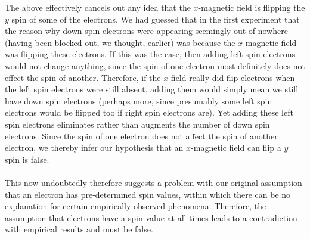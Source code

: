 The above effectively cancels out any idea that the $x$-magnetic field is flipping the $y$ spin of some of the electrons. We had guessed that in the first experiment that the reason why down spin electrons were appearing seemingly out of nowhere (having been blocked out, we thought, earlier) was because the $x$-magnetic field was flipping these electrons. If this was the case, then adding left spin electrons would not change anything, since the spin of one electron most definitely does not effect the spin of another. Therefore, if the $x$ field really did flip electrons when the left spin electrons were still absent, adding them would simply mean we still have down spin electrons (perhaps more, since presumably some left spin electrons would be flipped too if right spin electrons are). Yet adding these left spin electrons eliminates rather than augments the number of down spin electrons. Since the spin of one electron does not affect the spin of another electron, we thereby infer our hypothesis that an $x$-magnetic field can flip a $y$ spin is false.
\\\\
This now undoubtedly therefore suggests a problem with our original assumption that an electron has pre-determined spin values, within which there can be no explanation for certain empirically observed phenomena. Therefore, the assumption that electrons have a spin value at all times leads to a contradiction with empirical results and must be false.
